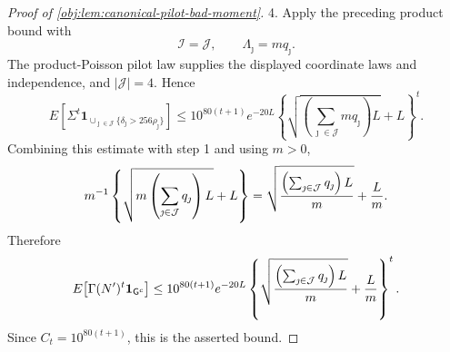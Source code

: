 \begin{proof}[Proof of \cref{obj:lem:canonical-pilot-bad-moment}]
4.  Apply the preceding product bound with
\[
\mathcal I=\mathcal J,
\qquad
\Lambda_\jmath=mq_\jmath .
\]
The product-Poisson pilot law supplies the displayed coordinate laws and
independence, and \(|\mathcal J|=4\).  Hence
\[
E\!\left[
\Sigma^t
\mathbf 1_{\cup_{\jmath\in\mathcal J}\{\delta_\jmath>256\rho_\jmath\}}
\right]
\le
10^{80(t+1)}e^{-20L}
\left\{
\sqrt{\left(\sum_{\jmath\in\mathcal J}mq_\jmath\right)L}+L
\right\}^{t}.
\]
Combining this estimate with step 1 and using \(m>0\),
\[
m^{-1}
\left\{
\sqrt{m\left(\sum_{\jmath\in\mathcal J}q_\jmath\right)L}+L
\right\}
=
\sqrt{{\left(\sum_{\jmath\in\mathcal J}q_\jmath\right)L\over m}}
+
{L\over m}.
\]
Therefore
\[
E\!\left[\Gamma(N')^t\mathbf 1_{\mathsf G^c}\right]
\le
10^{80(t+1)}e^{-20L}
\left\{
\sqrt{{\left(\sum_{\jmath\in\mathcal J}q_\jmath\right)L\over m}}
+
{L\over m}
\right\}^{t}.
\]
Since \(C_t=10^{80(t+1)}\), this is the asserted bound.
\end{proof}
